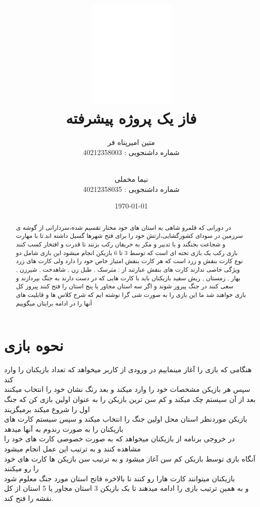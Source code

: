 \documentclass[pdf,titlepage,a4paper]{report}
\title{\includegraphics[scale=0.8]{Graphics/BASU_logo.png} \\ \Huge{فاز یک پروژه پیشرفته}}
\author{متین امیرپناه فر \\ شماره داشنجویی : 40212358003
		  \and \\ نیما مخملی \\ شماره داشنجویی : 40212358035}
\date{\today}
\begin{document}
	\color{white}
	\maketitle
	\color{black}
	\tableofcontents
	\newpage

	\begin{abstract}
		
		در دورانی که قلمرو شاهی به استان های خود مختار تقسیم شده،سردارانی از گوشه ی سرزمین در سودای کشورگشایی،ارتش خود را برای فتح شهرها گسیل داشته اند.تا با مهارت و شجاعت بجنگند و با تدبیر و مکر به حریفان رکب بزنند تا قدرت و افتخار کسب کنند \\

     بازی رکب یک بازی تخته ای است که توسط 3 تا 6 بازیکن انجام میشود 
	 این بازی شامل دو نوع کارت بنفش و زرد است که هر کارت بنفش امتیاز خاص خود را دارد ولی کارت های زرد ویژگی خاصی ندارند
	 کارت های بنفش عبارتند از : مترسک , طبل زن , شاهدخت ,  شیرزن  ,  بهار  , زمستان , ریش سفید 
	 بازیکنان باید با کارت هایی که در دست دارند به جنگ بپردازند و سعی کنند در جنگ پیروز شوند و اگر سه استان مجاور یا پنج استان را فتح کنند پیروز کل بازی خواهند شد 
	 ما این بازی را به صورت شی گرا نوشته ایم که شرح کلاس ها و قابلیت های آنها را در ادامه برایتان میگوییم
	  
	\end{abstract}
    
	\newpage
    \part{نحوه بازی}
     هنگامی که بازی را آغاز مینماییم در ورودی از کاربر میخواهد که تعداد بازیکنان را وارد کند \\
     سپس هر بازیکن مشخصات خود را وارد میکند و بعد رنگ نشان خود را انتخاب میکنند \\
	 بعد از آن سیستم چک میکند و کم سن ترین بازیکن را به عنوان اولین بازی کن که جنگ اول را شروع میکند برمیگزیند\\
	 بازیکن موردنظر استان محل اولین جنگ را انتخاب میکند و سپس سیستم کارت های بازیکنان را به صورت رندوم به آنها میدهد \\
	 در خروجی برنامه از بازیکنان میخواهد که به صورت خصوصی کارت های خود را مشاهده کنند و به ترتیب این عمل انجام میشود\\
	 آنگاه بازی توسط بازیکن کم سن آغاز میشود و به ترتیب سن بازیکن ها کارت های خود را رو میکنند\\
	 بازیکنان میتوانند کارت هارا رو کنند تا بالاخره فاتح استان مورد جنگ معلوم شود\\
	 و به همین ترتیب بازی را ادامه میدهند تا یک بازیکن 3 استان مجاور یا 5 استان از کل نقشه را فتح کند.\\
	
\end{document}
